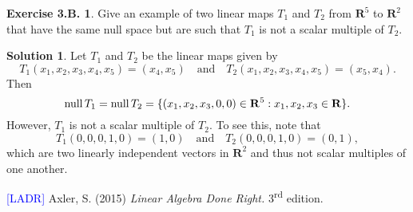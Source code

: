 \documentclass[12pt]{article}
\theoremstyle{definition}
\theoremstyle{exercise}
\newtheorem{exercise}{Exercise 3.B.}
\theoremstyle{solution}
\newtheorem*{solution}{Solution}
\newcommand{\ts}{\textsuperscript}
\newcommand{\Null}{\text{null\,}}
\newcommand{\quand}{\quad \text{and} \quad}
\newcommand{\R}{\mathbf{R}}
\begin{document}
\begin{exercise}
\label{ex:31}
    Give an example of two linear maps \( T_1 \) and \( T_2 \) from \( \R^5 \) to \( \R^2 \) that have the same null space but are such that \( T_1 \) is not a scalar multiple of \( T_2 \).
\end{exercise}

\begin{solution}
    Let \( T_1 \) and \( T_2 \) be the linear maps given by
    \[
        T_1(x_1, x_2, x_3, x_4, x_5) = (x_4, x_5) \quand T_2(x_1, x_2, x_3, x_4, x_5) = (x_5, x_4).
    \]
    Then
    \[
        \Null T_1 = \Null T_2 = \{ (x_1, x_2, x_3, 0, 0) \in \R^5 : x_1, x_2, x_3 \in \R \}.
    \]
    However, \( T_1 \) is not a scalar multiple of \( T_2 \). To see this, note that
    \[
        T_1(0, 0, 0, 1, 0) = (1, 0) \quand T_2(0, 0, 0, 1, 0) = (0, 1),
    \]
    which are two linearly independent vectors in \( \R^2 \) and thus not scalar multiples of one another.
\end{solution}

\noindent \hrulefill

\noindent \hypertarget{ladr}{\textcolor{blue}{[LADR]} Axler, S. (2015) \textit{Linear Algebra Done Right.} 3\ts{rd} edition.}
\end{document}
